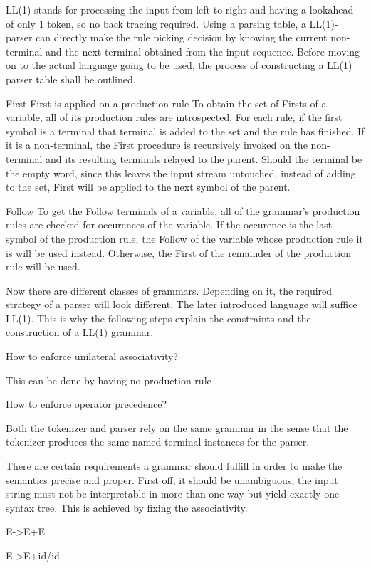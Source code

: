 LL(1) stands for processing the input from left to right and having a lookahead of only 1 token, so no back tracing required. Using a parsing table, a LL(1)-parser can directly make the rule picking decision by knowing the current non-terminal and the next terminal obtained from the input sequence. Before moving on to the actual language going to be used, the process of constructing a LL(1) parser table shall be outlined.

First
First is applied on a production rule
To obtain the set of Firsts of a variable, all of its production rules are introspected. For each rule, if the first symbol is a terminal that terminal is added to the set and the rule has finished. If it is a non-terminal, the First procedure is recursively invoked on the non-terminal and its resulting terminals relayed to the parent. Should the terminal be the empty word, since this leaves the input stream untouched, instead of adding \epsilon to the set, First will be applied to the next symbol of the parent.

Follow
To get the Follow terminals of a variable, all of the grammar's production rules are checked for occurences of the variable. If the occurence is the last symbol of the production rule, the Follow of the variable whose production rule it is will be used instead. Otherwise, the First of the remainder of the production rule will be used.

Now there are different classes of grammars. Depending on it, the required strategy of a parser will look different. The later introduced language will suffice LL(1). This is why the following steps explain the constraints and the construction of a LL(1) grammar.

How to enforce unilateral associativity?

This can be done by having no production rule 

How to enforce operator precedence?

Both the tokenizer and parser rely on the same grammar in the sense that the tokenizer produces the same-named terminal instances for the parser.

There are certain requirements a grammar should fulfill in order to make the semantics precise and proper. First off, it should be unambiguous, the input string must not be interpretable in more than one way but yield exactly one syntax tree. This is achieved by fixing the associativity.

E->E+E

E->E+id/id

